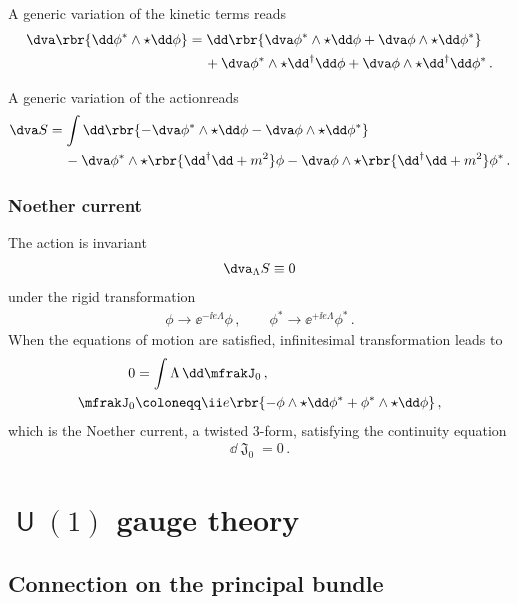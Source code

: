 \documentclass[a4paper]{article}
\begin{document}
A generic variation of the kinetic terms reads
\begin{align}
\begin{split}
\dva \rbr{\dd \phi^*\wedge\star\dd\phi} &= 
\dd\rbr{\dva\phi^*\wedge\star\dd\phi + \dva\phi\wedge\star\dd\phi^*}
\\
&\quad\,+
\dva\phi^*\wedge\star\dd^{\dagger}\dd\phi +
\dva\phi\wedge\star\dd^{\dagger}\dd\phi^*\,.
\end{split}
\end{align}

A generic variation of the actionreads
\begin{align}
\dva S &=
\int \dd\rbr{-\dva\phi^*\wedge\star\dd\phi -
\dva\phi\wedge\star\dd\phi^*}
\nonumber \\
&\quad\,-
\dva\phi^*\wedge\star\rbr{\dd^{\dagger}\dd+m^2}\phi -
\dva\phi\wedge\star\rbr{\dd^{\dagger}\dd+m^2}\phi^*\,.
\end{align}


\subsubsection{Noether current}
The action is invariant
\begin{align}
\dva_{\Lambda} S \equiv 0
\end{align}
under the rigid transformation
\begin{align}
\phi \to \ee^{-\ii e \Lambda} \phi\,,\qquad
\phi^* \to \ee^{+\ii e \Lambda} \phi^*\,.
\end{align}
When the equations of motion are satisfied, infinitesimal 
transformation leads to
\begin{align}
0 &= \int \Lambda\, \dd \mfrakJ_0\,,
\nonumber \\
\mfrakJ_0 &\coloneqq \ii e\rbr{- \phi\wedge\star\dd\phi^* +
	\phi^*\wedge\star\dd\phi}\,,
\end{align}
which is the Noether current, a twisted $3$-form, satisfying the continuity 
equation
\begin{align}
\dd \mfrakJ_0 = 0\,.
\end{align}

\section[$U(1)$ gauge theory]{$\msansU(1)$ gauge theory}

\subsection{Connection on the principal bundle}
\end{document}
